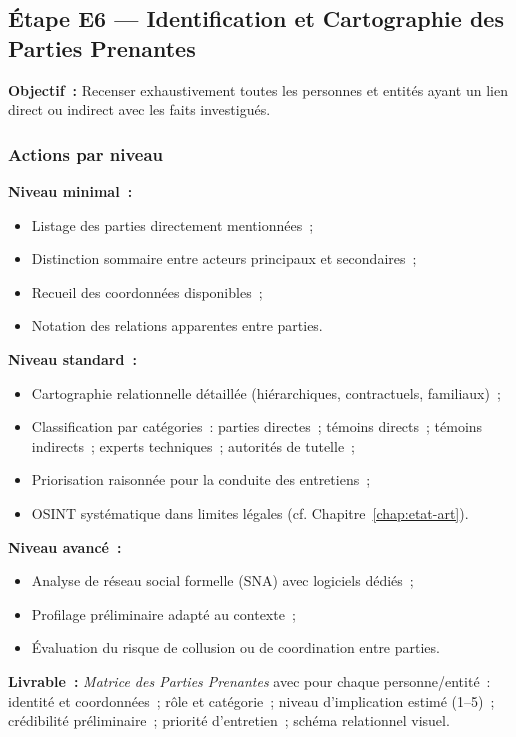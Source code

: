 \subsection{Étape E6 --- Identification et Cartographie des Parties Prenantes}

\textbf{Objectif~:} Recenser exhaustivement toutes les personnes et entités ayant
un lien direct ou indirect avec les faits investigués.

\subsubsection*{Actions par niveau}

\textbf{Niveau minimal~:}
\begin{itemize}
    \item Listage des parties directement mentionnées~;
    \item Distinction sommaire entre acteurs principaux et secondaires~;
    \item Recueil des coordonnées disponibles~;
    \item Notation des relations apparentes entre parties.
\end{itemize}

\textbf{Niveau standard~:}
\begin{itemize}
    \item Cartographie relationnelle détaillée (hiérarchiques, contractuels,
          familiaux)~;
    \item Classification par catégories~: parties directes~; témoins directs~;
          témoins indirects~; experts techniques~; autorités de tutelle~;
    \item Priorisation raisonnée pour la conduite des entretiens~;
    \item OSINT systématique dans limites légales (cf. Chapitre~\ref{chap:etat-art}).
\end{itemize}

\textbf{Niveau avancé~:}
\begin{itemize}
    \item Analyse de réseau social formelle (SNA) avec logiciels dédiés~;
    \item Profilage préliminaire adapté au contexte~;
    \item Évaluation du risque de collusion ou de coordination entre parties.
\end{itemize}

\textbf{Livrable~:} \textit{Matrice des Parties Prenantes} avec pour chaque
personne/entité~: identité et coordonnées~; rôle et catégorie~; niveau
d'implication estimé (1--5)~; crédibilité préliminaire~; priorité d'entretien~;
schéma relationnel visuel.

